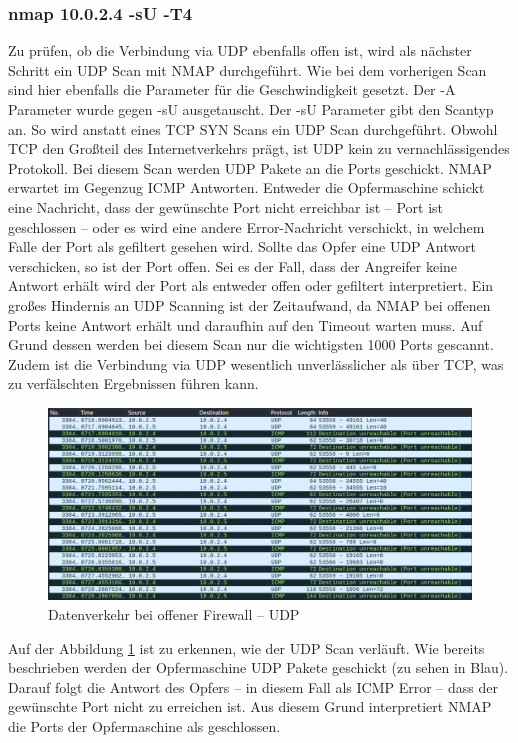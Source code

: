 \subsubsection{nmap 10.0.2.4 -sU -T4}
 Zu prüfen, ob die Verbindung via UDP ebenfalls offen ist, wird als nächster Schritt ein UDP Scan mit NMAP durchgeführt. Wie bei dem vorherigen Scan sind hier ebenfalls die Parameter für die Geschwindigkeit gesetzt. Der -A Parameter wurde gegen -sU ausgetauscht. Der -sU Parameter gibt den Scantyp an. So wird anstatt eines TCP SYN Scans ein UDP Scan durchgeführt. Obwohl TCP den Großteil des Internetverkehrs prägt, ist UDP kein zu vernachlässigendes Protokoll. Bei diesem Scan werden UDP Pakete an die Ports geschickt. NMAP erwartet im Gegenzug ICMP Antworten. Entweder die Opfermaschine schickt eine Nachricht, dass der gewünschte Port nicht erreichbar ist – Port ist geschlossen – oder es wird eine andere Error-Nachricht verschickt, in welchem Falle der Port als gefiltert gesehen wird. Sollte das Opfer eine UDP Antwort verschicken, so ist der Port offen. Sei es der Fall, dass der Angreifer keine Antwort erhält wird der Port als entweder offen oder gefiltert interpretiert. 
Ein großes Hindernis an UDP Scanning ist der Zeitaufwand, da NMAP bei offenen Ports keine Antwort erhält und daraufhin auf den Timeout warten muss. Auf Grund dessen werden bei diesem Scan nur die wichtigsten 1000 Ports gescannt. Zudem ist die Verbindung via UDP wesentlich unverlässlicher als über TCP, was zu verfälschten Ergebnissen führen kann.

\begin{figure}
	\includegraphics[width=\linewidth]{img/ws_firewall_open_udp.png}
	\caption{Datenverkehr bei offener Firewall – UDP}
	\label{fig:ws_firewall_open_udp}
\end{figure}

Auf der Abbildung \ref{fig:ws_firewall_open_udp} ist zu erkennen, wie der UDP Scan verläuft. Wie bereits beschrieben werden der Opfermaschine UDP Pakete geschickt (zu sehen in Blau). Darauf folgt die Antwort des Opfers – in diesem Fall als ICMP Error – dass der gewünschte Port nicht zu erreichen ist. Aus diesem Grund interpretiert NMAP die Ports der Opfermaschine als geschlossen. \newpage

